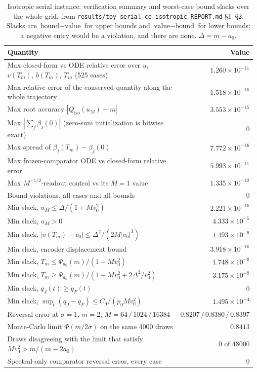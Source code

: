 \begin{table}[htbp]
\centering
\small
\setlength{\tabcolsep}{4pt}
\caption{Isotropic serial instance: verification summary and worst-case bound
slacks over the whole grid, from
\texttt{results/toy\_serial\_ce\_isotropic\_REPORT.md} \S1--\S2. Slacks are
$\text{bound} - \text{value}$ for upper bounds and $\text{value} -
\text{bound}$ for lower bounds; a negative entry would be a violation, and
there are none. $\Delta = m - a_0$.}
\label{tab:app_toy_iso}
\begin{tabular}{lr}
\toprule
Quantity & Value \\
\midrule
Max closed-form vs ODE relative error over $u$, $v(T_m)$, $b(T_m)$, $T_m$ (525 cases) & $1.260\times10^{-11}$ \\
Max relative error of the conserved quantity along the whole trajectory & $1.518\times10^{-10}$ \\
Max root accuracy $|Q_{\mathrm{iso}}(u_M) - m|$ & $3.553\times10^{-15}$ \\
Max $|\sum_j \beta_j(0)|$ (zero-sum initialization is bitwise exact) & $0$ \\
Max spread of $\beta_j(T_m) - \beta_j(0)$ & $7.772\times10^{-16}$ \\
Max frozen-comparator ODE vs closed-form relative error & $5.993\times10^{-11}$ \\
Max $M^{-1/2}$-readout control vs its $M = 1$ value & $1.335\times10^{-12}$ \\
Bound violations, all cases and all bounds & $0$ \\
\midrule
Min slack, $u_M \le \Delta/(1 + Mv_0^2)$ & $2.221\times10^{-10}$ \\
Min slack, $u_M > 0$ & $4.333\times10^{-5}$ \\
Min slack, $|v(T_m) - v_0| \le \Delta^2/(2M|v_0|^3)$ & $1.493\times10^{-9}$ \\
Min slack, encoder displacement bound & $3.918\times10^{-10}$ \\
Min slack, $T_m \le \Psi_{a_0}(m)/(1 + Mv_0^2)$ & $1.748\times10^{-9}$ \\
Min slack, $T_m \ge \Psi_{a_0}(m)/(1 + Mv_0^2 + 2\Delta^2/v_0^2)$ & $3.175\times10^{-9}$ \\
Min slack, $q_J(t) \ge q_F(t)$ & $0$ \\
Min slack, $\sup_t (q_J - q_F) \le C_0/(p_0 M v_0^2)$ & $1.495\times10^{-4}$ \\
\midrule
Reversal error at $\sigma = 1$, $m = 2$, $M = 64\,/\,1024\,/\,16384$ & $0.8207\,/\,0.8380\,/\,0.8397$ \\
Monte-Carlo limit $\Phi(m/2\sigma)$ on the same $4000$ draws & $0.8413$ \\
Draws disagreeing with the limit that satisfy $Mv_0^2 > m/(m - 2a_0)$ & $0$ of $48000$ \\
Spectral-only comparator reversal error, every case & $0$ \\
\bottomrule
\end{tabular}
\end{table}

